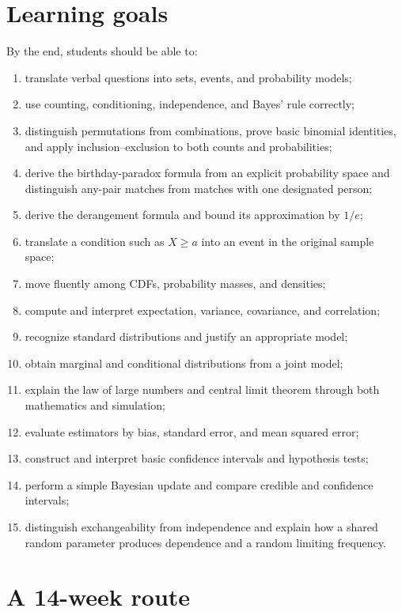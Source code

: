 \section*{Learning goals}

By the end, students should be able to:
\begin{enumerate}
  \item translate verbal questions into sets, events, and probability models;
  \item use counting, conditioning, independence, and Bayes' rule correctly;
  \item distinguish permutations from combinations, prove basic binomial identities, and apply inclusion--exclusion to both counts and probabilities;
  \item derive the birthday-paradox formula from an explicit probability space and distinguish any-pair matches from matches with one designated person;
  \item derive the derangement formula and bound its approximation by $1/e$;
  \item translate a condition such as $X\ge a$ into an event in the original sample space;
  \item move fluently among CDFs, probability masses, and densities;
  \item compute and interpret expectation, variance, covariance, and correlation;
  \item recognize standard distributions and justify an appropriate model;
  \item obtain marginal and conditional distributions from a joint model;
  \item explain the law of large numbers and central limit theorem through both mathematics and simulation;
  \item evaluate estimators by bias, standard error, and mean squared error;
  \item construct and interpret basic confidence intervals and hypothesis tests;
  \item perform a simple Bayesian update and compare credible and confidence intervals;
  \item distinguish exchangeability from independence and explain how a shared random parameter produces dependence and a random limiting frequency.
\end{enumerate}

\section*{A 14-week route}

